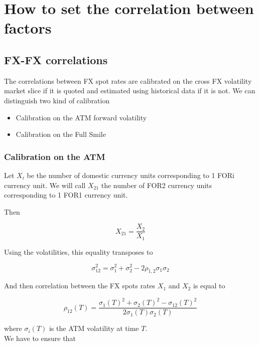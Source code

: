 \documentclass{article}
\begin{document}
\section{How to set the correlation between factors}

\subsection{FX-FX correlations}
The correlations between FX spot rates are calibrated on the cross FX volatility market slice if it is quoted and estimated using historical data if it is not. We can distinguish two kind of calibration

\begin{itemize}
	\item Calibration on the ATM forward volatility
	\item Calibration on the Full Smile
\end{itemize}

\subsubsection{Calibration on the ATM}
Let $X_i$ be the number of domestic currency units corresponding to 1 FORi currency unit. We will call $X_{21}$ the number of FOR2 currency units corresponding to 1 FOR1 currency unit.

\noindent Then 

\begin{equation}
	X_{21} = \frac{X_2}{X_1}
\end{equation}

\noindent Using the volatilities, this equality transposes to 

\begin{equation}
	\sigma_{12} ^2= \sigma_1^2 + \sigma_2^2 - 2 \rho_{1,2} \sigma_1 \sigma_2
\end{equation}

\noindent And then correlation between the FX spots rates $X_1$ and $X_2$ is equal to 

\begin{equation}
	\rho_{12}(T) = \frac{\sigma_1(T)^2 + \sigma_2(T)^2 - \sigma_{12}(T)^2}{2 \sigma_1(T) \sigma_2(T)}
\end{equation} 

\noindent where $\sigma_i(T)$ is the ATM volatility at time $T$.\\

\noindent We have to ensure that 
\end{document}
